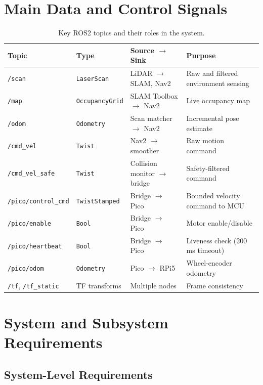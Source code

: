 \documentclass[12pt,a4paper]{report}
\begin{document}
\section{Main Data and Control Signals}

\begin{table}[H]
\centering
\caption{Key ROS2 topics and their roles in the system.}
\label{tab:signals}
\begin{tabularx}{\textwidth}{|p{3.2cm}|p{2.2cm}|p{2.8cm}|X|}
\hline
\textbf{Topic} & \textbf{Type} & \textbf{Source $\rightarrow$ Sink} & \textbf{Purpose} \\
\hline
\texttt{/scan} & \texttt{LaserScan} & LiDAR $\rightarrow$ SLAM, Nav2 & Raw and filtered environment sensing \\
\hline
\texttt{/map} & \texttt{OccupancyGrid} & SLAM Toolbox $\rightarrow$ Nav2 & Live occupancy map \\
\hline
\texttt{/odom} & \texttt{Odometry} & Scan matcher $\rightarrow$ Nav2 & Incremental pose estimate \\
\hline
\texttt{/cmd\_vel} & \texttt{Twist} & Nav2 $\rightarrow$ smoother & Raw motion command \\
\hline
\texttt{/cmd\_vel\_safe} & \texttt{Twist} & Collision monitor $\rightarrow$ bridge & Safety-filtered command \\
\hline
\texttt{/pico/control\_cmd} & \texttt{TwistStamped} & Bridge $\rightarrow$ Pico & Bounded velocity command to MCU \\
\hline
\texttt{/pico/enable} & \texttt{Bool} & Bridge $\rightarrow$ Pico & Motor enable/disable \\
\hline
\texttt{/pico/heartbeat} & \texttt{Bool} & Bridge $\rightarrow$ Pico & Liveness check (200 ms timeout) \\
\hline
\texttt{/pico/odom} & \texttt{Odometry} & Pico $\rightarrow$ RPi5 & Wheel-encoder odometry \\
\hline
\texttt{/tf}, \texttt{/tf\_static} & TF transforms & Multiple nodes & Frame consistency \\
\hline
\end{tabularx}
\end{table}

\section{System and Subsystem Requirements}

\subsection{System-Level Requirements}
\end{document}
